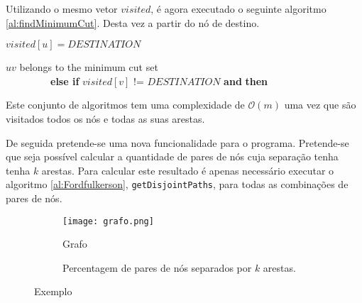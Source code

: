 \documentclass{article}
\begin{document}
Utilizando o mesmo vetor $visited$, é agora executado o seguinte algoritmo \ref{al:findMinimumCut}. Desta vez a partir do nó de destino.


\begin{algorithm}[H]
\caption{}
\label{al:findMinimumCut}
\begin{algorithmic}[1]
  
  \State $visited[u] = DESTINATION$
   
      \State $uv$ belongs to the minimum cut set \\
\ \ \ \ \ \ \ \ \  \textbf{else if} {$visited[v]$ != $DESTINATION$ \textbf{and} } \textbf{then}
      \State {}
    \EndIf
  \EndFor  
\EndFunction
\end{algorithmic}
\end{algorithm}

Este conjunto de algoritmos tem uma complexidade de $\mathcal{O}(m)$ uma vez que são visitados todos os nós e todas as suas arestas.

De seguida pretende-se uma nova funcionalidade para o programa. Pretende-se que seja possível calcular a quantidade de pares de nós cuja separação tenha tenha $k$ arestas. Para calcular este resultado é apenas necessário executar o algoritmo \ref{al:Fordfulkerson}, \texttt{getDisjointPaths}, para todas as combinações de pares de nós.


\begin{figure}[H]
\centering
\begin{subfigure}{.3\textwidth}
  \centering
  \texttt{[image: grafo.png]}
  \caption{Grafo}
  \label{fig:sub1}
\end{subfigure}%
\begin{subfigure}{.6\textwidth}
  \centering
  \begin{bchart}[step=20,max=100, unit=\%]
            \smallskip
            \smallskip
    \end{bchart}
  \caption{Percentagem de pares de nós separados por $k$ arestas.}
  \label{fig:sub2}
\end{subfigure}
\caption{Exemplo}
\label{fig:test}
\end{figure}
\end{document}
